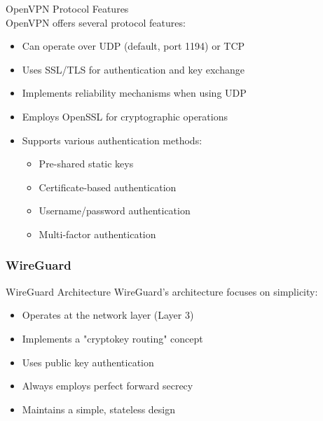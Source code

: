\begin{theorem}{OpenVPN Protocol Features}\\
OpenVPN offers several protocol features:
\begin{itemize}
    \item Can operate over UDP (default, port 1194) or TCP
    \item Uses SSL/TLS for authentication and key exchange
    \item Implements reliability mechanisms when using UDP
    \item Employs OpenSSL for cryptographic operations
    \item Supports various authentication methods:
    \begin{itemize}
        \item Pre-shared static keys
        \item Certificate-based authentication
        \item Username/password authentication
        \item Multi-factor authentication
    \end{itemize}
\end{itemize}
\end{theorem}

\subsubsection{WireGuard}

\begin{concept}{WireGuard Architecture}
WireGuard's architecture focuses on simplicity:
\begin{itemize}
    \item Operates at the network layer (Layer 3)
    \item Implements a "cryptokey routing" concept
    \item Uses public key authentication
    \item Always employs perfect forward secrecy
    \item Maintains a simple, stateless design
\end{itemize}
\end{concept}

